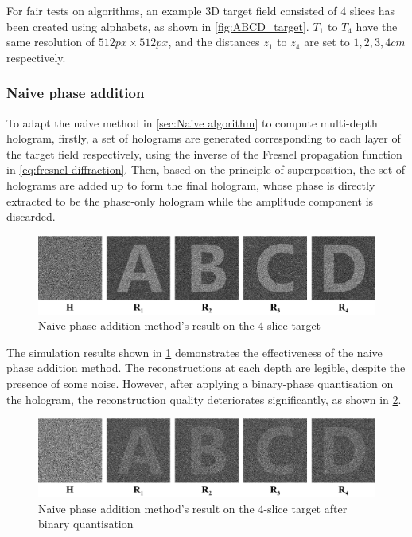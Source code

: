 For fair tests on algorithms, an example 3D target field consisted of 4 slices has been created using alphabets, as shown in \cref{fig:ABCD_target}. $T_1$ to $T_4$ have the same resolution of $512px \times 512px$, and the distances $z_1$ to $z_4$ are set to $1, 2, 3, 4 cm$ respectively.


\subsubsection{Naive phase addition}
To adapt the naive method in \cref{sec:Naive algorithm} to compute multi-depth hologram, firstly, a set of holograms are generated corresponding to each layer of the target field respectively, using the inverse of the Fresnel propagation function in \cref{eq:fresnel-diffraction}. Then, based on the principle of superposition, the set of holograms are added up to form the final hologram, whose phase is directly extracted to be the phase-only hologram while the amplitude component is discarded.

\begin{figure}[H]
	\centering
	\includegraphics[width=1.0\textwidth]{ABCD/Naive_ABCD.pdf}
	\caption{Naive phase addition method's result on the 4-slice target}
	\label{fig:Naive_ABCD}
\end{figure}

The simulation results shown in \cref{fig:Naive_ABCD} demonstrates the effectiveness of the naive phase addition method. The reconstructions at each depth are legible, despite the presence of some noise. However, after applying a binary-phase quantisation on the hologram, the reconstruction quality deteriorates significantly, as shown in \cref{fig:Naive_ABCD_binary}.

\begin{figure}[H]
	\centering
	\includegraphics[width=1.0\textwidth]{ABCD/Naive_ABCD_binary.pdf}
	\caption{Naive phase addition method's result on the 4-slice target after binary quantisation}
	\label{fig:Naive_ABCD_binary}
\end{figure}

